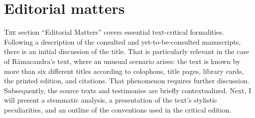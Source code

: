 %
%
%
%
%
\newpage 
\section{Editorial matters}

\lettrine[lines=2, lhang=0.2, loversize=0.25]{T}{he} section ``Editorial Matters'' covers essential text-critical formalities. Following a description of the consulted and yet-to-be-consulted manuscripts, there is an initial discussion of the title. That is particularly relevant in the case of Rāmacandra's text, where an unusual scenario arises: the text is known by more than six different titles according to colophons, title pages, library cards, the printed edition, and citations. That phenomenon requires further discussion. Subsequently, the source texts and testimonies are briefly contextualized. Next, I will present a stemmatic analysis, a presentation of the text's stylistic peculiarities, and an outline of the conventions used in the critical edition.

